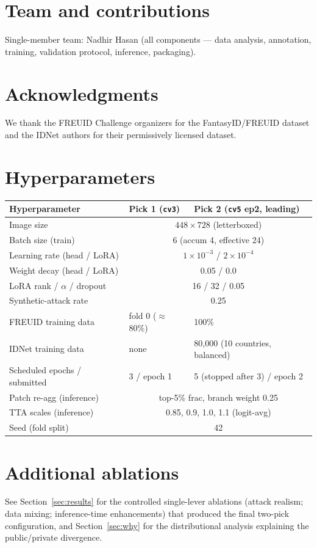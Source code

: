 \documentclass[11pt,a4paper]{article}
\begin{document}
\section{Team and contributions}
Single-member team: Nadhir Hasan (all components --- data analysis, annotation,
training, validation protocol, inference, packaging).

\section*{Acknowledgments}
We thank the FREUID Challenge organizers for the FantasyID/FREUID dataset and
the IDNet authors for their permissively licensed dataset.




\appendix
\section{Hyperparameters}
\label{app:hparams}
\begin{table}[H]
  \centering
  \small
  \begin{tabular}{lll}
    \toprule
    Hyperparameter & Pick 1 (\texttt{cv3}) & Pick 2 (\texttt{cv5} ep2, leading) \\
    \midrule
    Image size & \multicolumn{2}{c}{$448\times728$ (letterboxed)} \\
    Batch size (train) & \multicolumn{2}{c}{6 (accum 4, effective 24)} \\
    Learning rate (head / LoRA) & \multicolumn{2}{c}{$1\times10^{-3}$ / $2\times10^{-4}$} \\
    Weight decay (head / LoRA) & \multicolumn{2}{c}{0.05 / 0.0} \\
    LoRA rank / $\alpha$ / dropout & \multicolumn{2}{c}{16 / 32 / 0.05} \\
    Synthetic-attack rate & \multicolumn{2}{c}{0.25} \\
    FREUID training data & fold 0 ($\approx$80\%) & 100\% \\
    IDNet training data & none & 80{,}000 (10 countries, balanced) \\
    Scheduled epochs / submitted & 3 / epoch 1 & 5 (stopped after 3) / epoch 2 \\
    Patch re-agg (inference) & \multicolumn{2}{c}{top-5\% frac, branch weight 0.25} \\
    TTA scales (inference) & \multicolumn{2}{c}{0.85, 0.9, 1.0, 1.1 (logit-avg)} \\
    Seed (fold split) & \multicolumn{2}{c}{42} \\
    \bottomrule
  \end{tabular}
\end{table}

\section{Additional ablations}
See Section~\ref{sec:results} for the controlled single-lever ablations (attack
realism; data mixing; inference-time enhancements) that produced the final
two-pick configuration, and Section~\ref{sec:why} for the distributional
analysis explaining the public/private divergence.
\end{document}
